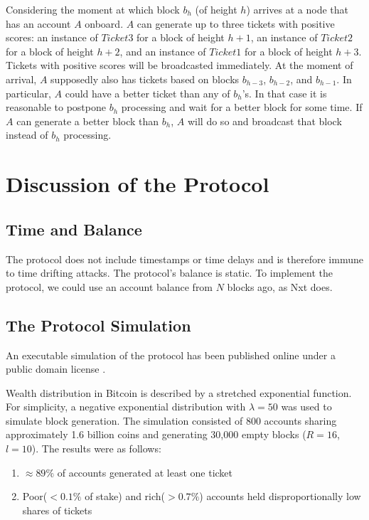 \documentclass[preprint,review,3p,times,twocolumn]{elsarticle}
\begin{document}
Considering the moment at which block \(b_h\) (of height \(h\)) arrives at a node that has an account \(A\) onboard. \(A\) can generate up to three tickets with positive scores: an instance of \(Ticket3\) for a block of height \(h+1\), an instance of \(Ticket2\) for a block of height \(h+2\), and an instance of \(Ticket1\) for a block of height \(h+3\). Tickets with positive scores will be broadcasted immediately. At the moment of arrival, \(A\) supposedly also has tickets based on blocks \(b_{h-3}\), \(b_{h-2}\), and \(b_{h-1}\). In particular, \(A\) could have a better ticket than any of \(b_h\)'s. In that case it is reasonable to postpone \(b_h\) processing and wait for a better block for some time. If \(A\) can generate a better block than \(b_h\), \(A\) will do so and broadcast that block instead of \(b_h\) processing.

\section{Discussion of the Protocol}
\label{s_discuss}

\subsection{Time and Balance}

The protocol does not include timestamps or time delays and is therefore immune to time drifting attacks. The protocol's balance is static. To implement the protocol, we could use an account balance from \(N\) blocks ago, as Nxt does.

\subsection{The Protocol Simulation}

An executable simulation of the protocol has been published online under a public domain license \cite{Chepurnoy}.

Wealth distribution in Bitcoin is described by a stretched exponential function\cite{Kondor2014}. For simplicity, a negative exponential distribution with \(\lambda=50\) was used to simulate block generation. The simulation consisted of 800 accounts sharing approximately 1.6 billion coins and generating 30,000 empty blocks (\(R=16\), \(l=10\)). The results were as follows: 

\begin{enumerate}
\item \(\approx 89\% \) of accounts generated at least one ticket

\item Poor(\(< 0.1\%\) of stake) and rich(\(>0.7\%\)) accounts held disproportionally low shares of tickets
\end{enumerate}
\end{document}
